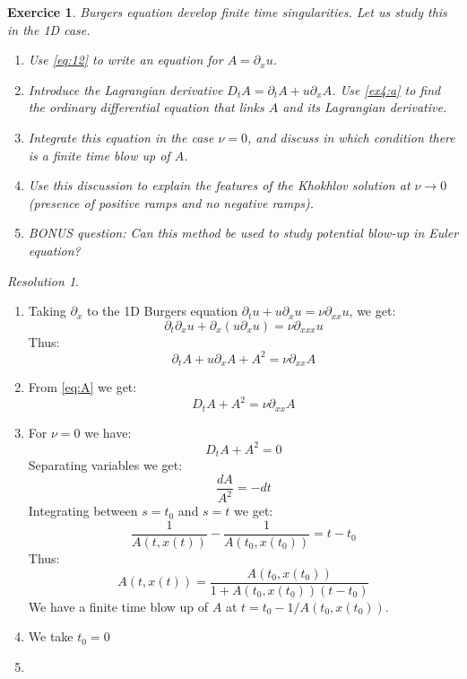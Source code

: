 \documentclass[10pt,a4paper]{article}
\newtheorem{exercici}{Exercice}
\theoremstyle{remark}
\newtheorem*{res}{Resolution}
\begin{document}
\begin{exercici}
  Burgers equation develop finite time singularities. Let us study this in the 1D case.
  \begin{enumerate}
    \item\label{ex4:a} Use \eqref{eq:12} to write an equation for $A = \partial_x u$.
    \item Introduce the Lagrangian derivative $D_t A = \partial_t A + u\partial_x A$. Use \ref{ex4:a} to find the ordinary differential equation that links $A$ and its Lagrangian derivative.
    \item Integrate this equation in the case $\nu = 0$, and discuss in which condition there is a finite time blow up of $A$.
    \item Use this discussion to explain the features of the Khokhlov solution at $\nu \to 0$ (presence of positive ramps and no negative ramps).
    \item BONUS question: Can this method be used to study potential blow-up in Euler equation?
  \end{enumerate}
\end{exercici}
\begin{res}\hfill
  \begin{enumerate}
    \item Taking $\partial_x$ to the 1D Burgers equation $\partial_t u + u\partial_x u = \nu \partial_{xx} u$, we get:
          \begin{equation*}
            \partial_t \partial_x u + \partial_x(u\partial_x u) = \nu \partial_{xxx} u
          \end{equation*}
          Thus:
          \begin{equation}\label{eq:A}
            \partial_t A + u\partial_x A + A^2 = \nu \partial_{xx} A
          \end{equation}
    \item From \cref{eq:A} we get:
          \begin{equation*}
            D_t A + A^2 = \nu \partial_{xx} A
          \end{equation*}
    \item For $\nu=0$ we have:
          \begin{equation*}
            D_t A + A^2 = 0
          \end{equation*}
          Separating variables we get:
          \begin{equation*}
            \frac{dA}{A^2} = -dt
          \end{equation*}
          Integrating between $s=t_0$ and $s=t$ we get:
          \begin{equation*}
            \frac{1}{A(t,x(t))} - \frac{1}{A(t_0,x(t_0))} = t-t_0
          \end{equation*}
          Thus:
          \begin{equation*}
            A(t,x(t)) = \frac{A(t_0,x(t_0))}{1+A(t_0,x(t_0))(t-t_0)}
          \end{equation*}
          We have a finite time blow up of $A$ at $t=t_0-1/A(t_0,x(t_0))$.
    \item We take $t_0=0$
    \item
  \end{enumerate}
\end{res}
\end{document}

